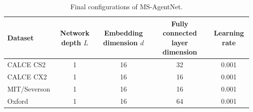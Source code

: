 \begin{table}
\TableStyle
\caption{Final configurations of MS-AgentNet.}
\label{tab:4-2}
\begin{tabularx}{\linewidth}{@{\extracolsep{\fill}}L{1.25}C{0.85}C{0.95}C{1.10}C{0.85}@{}}
\toprule
Dataset & Network depth $L$ & Embedding dimension $d$ & Fully connected layer dimension & Learning rate \\
\midrule
CALCE CS2 & 1 & 16 & 32 & 0.001 \\
CALCE CX2 & 1 & 16 & 16 & 0.001 \\
MIT/Severson & 1 & 16 & 16 & 0.001 \\
Oxford & 1 & 16 & 64 & 0.001 \\
\bottomrule
\end{tabularx}
\end{table}
